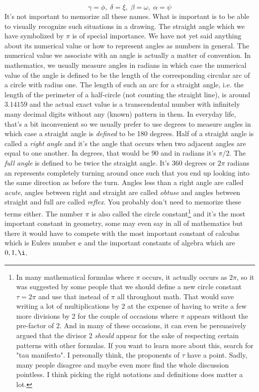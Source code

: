 \begin{equation}
  \gamma = \phi, \; \delta = \xi, \; \beta = \omega, \; \alpha = \psi
\end{equation}
It's not important to memorize all these names. What is important is to be able to visually recognize such situations in a drawing. The straight angle which we have symbolized by $\pi$ is of special importance. We have not yet said anything about its numerical value or how to represent angles as numbers in general. The numerical value we associate with an angle is actually a matter of convention. In mathematics, we usually measure angles in radians in which case the numerical value of the angle is defined to be the length of the corresponding circular arc of a circle with radius one. The length of such an arc for a straight angle, i.e. the length of the perimeter of a half-circle (not counting the straight line), is around $3.14159$ and the actual exact value is a transcendental number with infinitely many decimal digits without any (known) pattern in them. In everyday life, that's a bit inconvenient so we usually prefer to use degrees to measure angles in which case a straight angle is \emph{defined} to be 180 degrees. Half of a straight angle is called a \emph{right angle} and it's the angle that occurs when two adjacent angles are equal to one another. In degrees, that would be 90 and in radians it's $\pi / 2$. The \emph{full angle} is defined to be twice the straight angle. It's 360 degrees or $2 \pi$ radians an represents completely turning around once such that you end up looking into the same direction as before the turn. Angles less than a right angle are called \emph{acute}, angles between right and straight are called \emph{obtuse} and angles between straight and full are called \emph{reflex}. You probably don't need to memorize these terms either. The number $\pi$ is also called the circle constant\footnote{In many mathematical formulas where $\pi$ occurs, it actually occurs as $2 \pi$, so it was suggested by some people that we should define a new circle constant $\tau = 2 \pi$ and use that instead of $\pi$ all throughout math. That would save writing a lot of multiplications by 2 at the expense of having to write a few more divisions by 2 for the couple of occasions where $\pi$ appears without the pre-factor of 2. And in many of these occasions, it can even be persuasively argued that the divisor 2 \emph{should} appear for the sake of respecting certain patterns with other formulas. If you want to learn more about this, search for "tau manifesto". I personally think, the proponents of $\tau$ have a point. Sadly, many people disagree and maybe even more find the whole discussion pointless. I think picking the right notations and definitions does matter a lot.} and it's the most important constant in geometry, some may even say in all of mathematics but there it would have to compete with the most important constant of calculus which is Eulers number $\operatorname{\mathrm{e}}$ and the important constants of algebra which are $0,1, \i$.

